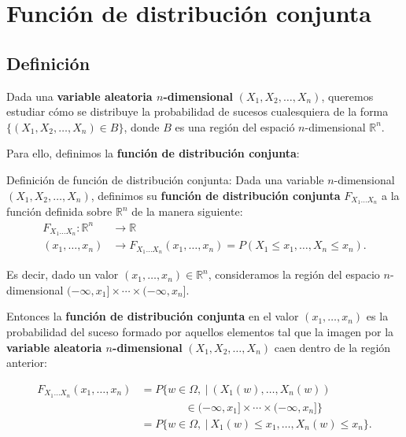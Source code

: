 \documentclass[]{book}
\begin{document}
\hypertarget{funciuxf3n-de-distribuciuxf3n-conjunta-1}{%
\section{Función de distribución conjunta}\label{funciuxf3n-de-distribuciuxf3n-conjunta-1}}

\hypertarget{definiciuxf3n-4}{%
\subsection{Definición}\label{definiciuxf3n-4}}

Dada una \textbf{variable aleatoria \(n\)-dimensional} \((X_1,X_2,\ldots,X_n)\), queremos estudiar cómo se distribuye la probabilidad de sucesos cualesquiera de la forma \(\{(X_1,X_2,\ldots,X_n)\in B\}\), donde \(B\) es una región del espació \(n\)-dimensional \(\mathbb{R}^n\).

Para ello, definimos la \textbf{función de distribución conjunta}:

Definición de función de distribución conjunta:
Dada una variable \(n\)-dimensional \((X_1,X_2,\ldots,X_n)\), definimos su \textbf{función de distribución conjunta} \(F_{X_1\ldots X_n}\) a la función definida sobre \(\mathbb{R}^n\) de la manera siguiente:
\[
\begin{array}{rl}
F_{X_1\ldots X_n}: \mathbb{R}^n & \longrightarrow \mathbb{R}\\
(x_1,\ldots,x_n) & \longrightarrow F_{X_1\ldots X_n}(x_1,\ldots,x_n)=P(X_1\leq x_1,\ldots,X_n\leq x_n).
\end{array}
\]

Es decir, dado un valor \((x_1,\ldots,x_n)\in \mathbb{R}^n\), consideramos la región del espacio \(n\)-dimensional \((-\infty,x_1]\times\cdots\times (-\infty,x_n]\).

Entonces la \textbf{función de distribución conjunta} en el valor \((x_1,\ldots,x_n)\) es la probabilidad del suceso formado por aquellos elementos tal que la imagen por la \textbf{variable aleatoria \(n\)-dimensional} \((X_1,X_2,\ldots,X_n)\) caen dentro de la región anterior:

\[
\begin{array}{rl}
F_{X_1\ldots X_n}(x_1,\ldots,x_n) & =P\{w\in\Omega,\ |\ (X_1(w),\ldots,X_n(w)) \\ & \qquad\qquad\in (-\infty,x_1]\times\cdots\times (-\infty,x_n]\} \\ & = P\{w\in\Omega,\ |\ X_1(w)\leq x_1,\ldots, X_n(w)\leq x_n\}.
\end{array}
\]
\end{document}
